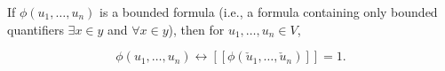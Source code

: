 If $\phi(u_1, \ldots, u_n)$ is a bounded formula (i.e., a formula containing only bounded quantifiers $\exists x \in y$ and $\forall x \in y$), then for $u_1, \ldots, u_n \in V$,

$$\phi(u_1, \ldots, u_n) \leftrightarrow [\![\phi(\check{u}_1, \ldots, \check{u}_n)]\!] = 1.$$

